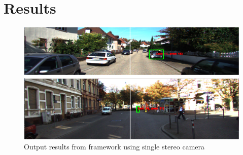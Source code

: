 \chapter{Results}
\label{capitulo5}

\begin{figure}[H]
\centering
\includegraphics[width=\textwidth]{imagens/ouput.png}
\caption{Output results from framework using single stereo camera}
\label{fig:output}
\end{figure}